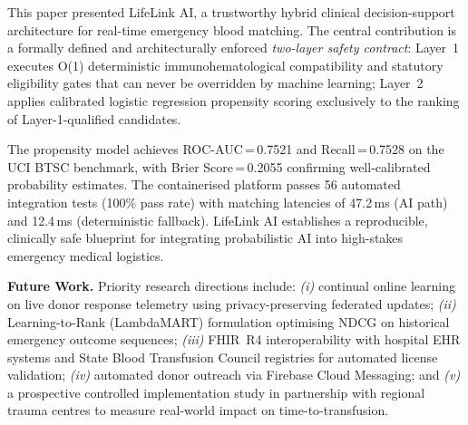 \documentclass[conference]{IEEEtran}
\begin{document}
This paper presented LifeLink AI, a trustworthy hybrid clinical
decision-support architecture for real-time emergency blood matching.
The central contribution is a formally defined and architecturally
enforced \emph{two-layer safety contract}: Layer~1 executes O(1)
deterministic immunohematological compatibility and statutory eligibility
gates that can never be overridden by machine learning; Layer~2 applies
calibrated logistic regression propensity scoring exclusively to the
ranking of Layer-1-qualified candidates.

The propensity model achieves ROC-AUC\,=\,0.7521 and Recall\,=\,0.7528
on the UCI BTSC benchmark, with Brier Score\,=\,0.2055 confirming
well-calibrated probability estimates. The containerised platform passes
56 automated integration tests (100\% pass rate) with matching latencies
of 47.2\,ms (AI path) and 12.4\,ms (deterministic fallback). LifeLink AI
establishes a reproducible, clinically safe blueprint for integrating
probabilistic AI into high-stakes emergency medical logistics.

\textbf{Future Work.} Priority research directions include:
\emph{(i)} continual online learning on live donor response telemetry
using privacy-preserving federated updates;
\emph{(ii)} Learning-to-Rank (LambdaMART) formulation optimising NDCG
on historical emergency outcome sequences;
\emph{(iii)} FHIR~R4 interoperability with hospital EHR systems and
State Blood Transfusion Council registries for automated license
validation;
\emph{(iv)} automated donor outreach via Firebase Cloud Messaging;
and \emph{(v)} a prospective controlled implementation study in
partnership with regional trauma centres to measure real-world impact
on time-to-transfusion.



\end{document}
